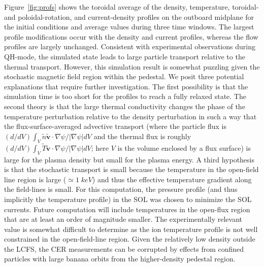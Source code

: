 Figure~\ref{fig:profs} shows the toroidal average of the density, temperature,
toroidal- and poloidal-rotation, and current-density profiles on the outboard
midplane for the initial conditions and average values during three time
windows. The largest profile modifications occur with the density and current
profiles, whereas the flow profiles are largely unchanged. Consistent with
experimental observations during QH-mode\cite{garofalo15}, the simulated state
leads to large particle transport relative to the thermal transport. However,
this simulation result is somewhat puzzling given the stochastic magnetic field
region within the pedestal. We posit three potential explanations that require
further investigation. The first possibility is that the simulation time is
too short for the profiles to reach a fully relaxed state. 
The second theory is that the large thermal conductivity
changes the phase of the temperature perturbation relative to the density
perturbation in such a way that the flux-surface-averaged advective transport
(where the particle flux is $(d/dV)\int_V \tilde{n} \tilde{\mathbf{v}} \cdot
\nabla \psi / |\nabla \psi| dV$ and the thermal flux is roughly 
$(d/dV)\int_V \tilde{T} \tilde{\mathbf{v}} \cdot \nabla \psi / |\nabla \psi|
dV$; here $V$ is the
volume enclosed by a flux surface) is large for the plasma density but small
for the plasma energy. A third hypothesis is that the stochastic transport is
small because the temperature in the open-field line region is large
($\simeq1\;keV$) and thus the effective temperature gradient along the
field-lines is small. For this computation, the pressure profile (and thus
implicitly the temperature profile) in the SOL was chosen to minimize the SOL
currents. Future computation will include temperatures in the open-flux region
that are at least an order of magnitude smaller. The experimentally relevant
value is somewhat difficult to determine as the ion temperature profile is not
well constrained in the open-field-line region. Given the relatively low
density outside the LCFS, the CER measurements can be corrupted by effects from
confined particles with large banana orbits from the higher-density pedestal
region.
